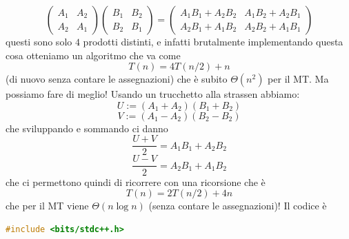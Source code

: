 \documentclass[11pt]{scrartcl}
\newcommand{\bigtheta}[1]{\Theta\!\left(#1\right)}
\begin{document}
	$$
	\begin{pmatrix}
		A_1 & A_2 \\
		A_2 & A_1
	\end{pmatrix}
	\begin{pmatrix}
		B_1 & B_2 \\
		B_2 & B_1
	\end{pmatrix}
	=
	\begin{pmatrix}
		A_1B_1+A_2B_2 & A_1B_2+A_2B_1 \\
		A_2B_1+A_1B_2 & A_2B_2+A_1B_1
	\end{pmatrix}
	$$
	questi sono solo $4$ prodotti distinti, e infatti brutalmente implementando questa cosa otteniamo un algoritmo che va come
	$$T(n)=4T(n/2)+n$$
	(di nuovo senza contare le assegnazioni) che è subito $\bigtheta{n^2}$ per il MT. Ma possiamo fare di meglio! Usando un trucchetto alla strassen abbiamo:
	$$U:=(A_1+A_2)(B_1+B_2)$$
	$$V:=(A_1-A_2)(B_2-B_2)$$
	che sviluppando e sommando ci danno
	$$\frac{U+V}{2}=A_1B_1+A_2B_2$$
	$$\frac{U-V}{2}=A_2B_1+A_1B_2$$
	che ci permettono quindi di ricorrere con una ricorsione che è
	$$T(n)=2T(n/2)+4n$$
	che per il MT viene $\bigtheta{n\log n}$ (senza contare le assegnazioni)! Il codice è
	\begin{lstlisting}[language=C++]
		#include <bits/stdc++.h>
	\end{lstlisting}
	
	\newpage
	
\end{document}
